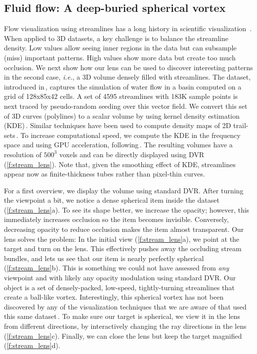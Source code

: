 \subsection{Fluid flow: A deep-buried spherical vortex}
\label{sec:flow}
%
%
Flow visualization using streamlines has a long history in scientific visualization~\cite{brambilla2012illustrative,merzkirch2012flow}. When applied to 3D datasets, a key challenge is to balance the streamline density. Low values allow seeing inner regions in the data but can subsample (miss) important patterns. High values show more data but create too much occlusion. We next show how our lens can be used to discover interesting patterns in the second case, \emph{i.e.}, a 3D volume densely filled with streamlines. The dataset, introduced in\,\cite{griebel2004flow}, captures the simulation of water flow in a basin computed on a grid of 128x85x42 cells. A set of 4595 streamlines with 183K sample points is next traced by pseudo-random seeding over this vector field. We convert this set of 3D curves (polylines) to a scalar volume by using kernel density estimation (KDE)\,\cite{silverman1986density}. Similar techniques have been used to compute density maps of 2D trail-sets\,\cite{hurter2012graph,cubu,hurter2015image}. To increase computational speed, we compute the KDE in the frequency space and using GPU acceleration, following\,\cite{lhuillier2017ffteb}. The resulting volumes have a resolution of $500^3$ voxels and can be directly displayed using DVR (\autoref{f:stream_lens}). Note that, given the smoothing effect of KDE, streamlines appear now as finite-thickness tubes rather than pixel-thin curves.

For a first overview, we display the volume using standard DVR. After turning the viewpoint a bit, we notice a dense spherical item inside the dataset (\autoref{f:stream_lens}a). To see its shape better, we increase the opacity; however, this immediately increases occlusion so the item becomes invisible. Conversely, decreasing opacity to reduce occlusion makes the item almost transparent. Our lens solves the problem: In the initial view (\autoref{f:stream_lens}a), we point at the target and turn on the lens. This effectively pushes away the occluding stream bundles, and lets us see that our item is nearly perfectly spherical (\autoref{f:stream_lens}b). This is something we could not have assessed from \emph{any} viewpoint and with likely any opacity modulation using standard DVR. Our object is a set of densely-packed, low-speed, tightly-turning streamlines that create a ball-like vortex. Interestingly, this spherical vortex has not been discovered by any of the visualization techniques that we are aware of that used this same dataset\,\cite{telea_vis_99,griebel2004flow,ddh,lhuillier2017ffteb}. To make sure our target is spherical, we view it in the lens from different directions, by interactively changing the ray directions in the lens (\autoref{f:stream_lens}c). Finally, we can close the lens but keep the target magnified (\autoref{f:stream_lens}d).


